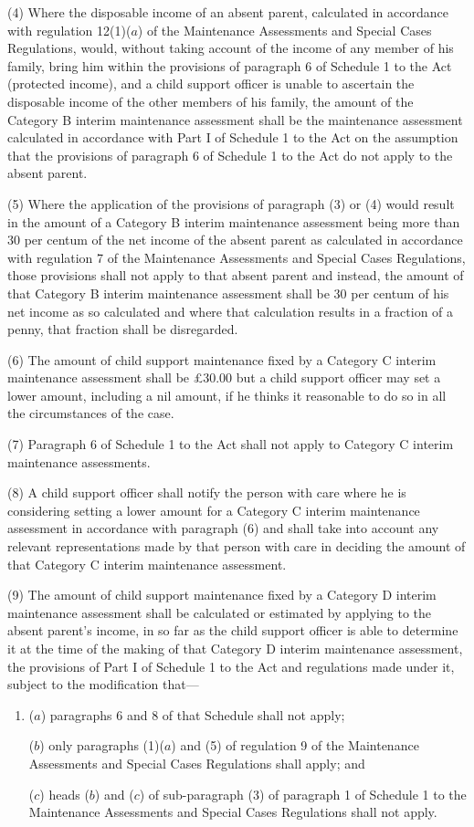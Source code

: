 \documentclass[a4paper]{article}
\begin{document}
(4) Where the disposable income of an absent parent, calculated in accordance with regulation 12(1)($a$) of the Maintenance Assessments and Special Cases Regulations, would, without taking account of the income of any member of his family, bring him within the provisions of paragraph 6 of Schedule 1 to the Act (protected income), and a child support officer is unable to ascertain the disposable income of the other members of his family, the amount of the Category B interim maintenance assessment shall be the maintenance assessment calculated in accordance with Part I of Schedule 1 to the Act on the assumption that the provisions of paragraph 6 of Schedule 1 to the Act do not apply to the absent parent.

(5) Where the application of the provisions of paragraph (3) or (4) would result in the amount of a Category B interim maintenance assessment being more than 30 per centum of the net income of the absent parent as calculated in accordance with regulation 7 of the Maintenance Assessments and Special Cases Regulations, those provisions shall not apply to that absent parent and instead, the amount of that Category B interim maintenance assessment shall be 30 per centum of his net income as so calculated and where that calculation results in a fraction of a penny, that fraction shall be disregarded.

(6) The amount of child support maintenance fixed by a Category C interim maintenance assessment shall be £30.00 but a child support officer may set a lower amount, including a nil amount, if he thinks it reasonable to do so in all the circumstances of the case.

(7) Paragraph 6 of Schedule 1 to the Act shall not apply to Category C interim maintenance assessments.

(8) A child support officer shall notify the person with care where he is considering setting a lower amount for a Category C interim maintenance assessment in accordance with paragraph (6) and shall take into account any relevant representations made by that person with care in deciding the amount of that Category C interim maintenance assessment.

(9) The amount of child support maintenance fixed by a Category D interim maintenance assessment shall be calculated or estimated by applying to the absent parent’s income, in so far as the child support officer is able to determine it at the time of the making of that Category D interim maintenance assessment, the provisions of Part I of Schedule 1 to the Act and regulations made under it, subject to the modification that—
\begin{enumerate}\item[]
($a$) paragraphs 6 and 8 of that Schedule shall not apply;

($b$) only paragraphs (1)($a$) and (5) of regulation 9 of the Maintenance Assessments and Special Cases Regulations shall apply; and

($c$) heads ($b$) and ($c$) of sub-paragraph (3) of paragraph 1 of Schedule 1 to the Maintenance Assessments and Special Cases Regulations shall not apply.
\end{enumerate}
\end{document}

